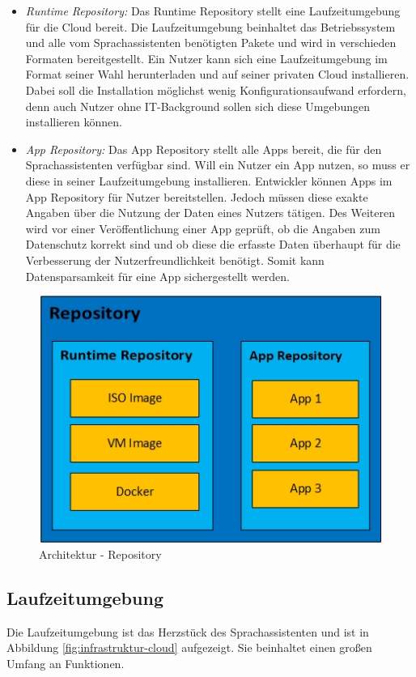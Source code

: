 \begin{itemize}
	\item \textsl{Runtime Repository:} Das Runtime Repository stellt eine Laufzeitumgebung für die Cloud bereit. Die Laufzeitumgebung beinhaltet das Betriebssystem und alle vom Sprachassistenten benötigten Pakete und wird in verschieden Formaten bereitgestellt. Ein Nutzer kann sich eine Laufzeitumgebung im Format seiner Wahl herunterladen und auf seiner privaten Cloud installieren. Dabei soll die Installation möglichst wenig Konfigurationsaufwand erfordern, denn auch Nutzer ohne IT-Background sollen sich diese Umgebungen installieren können. 
	\item \textsl{App Repository:} Das App Repository stellt alle Apps bereit, die für den Sprachassistenten verfügbar sind. Will ein Nutzer ein App nutzen, so muss er diese in seiner Laufzeitumgebung installieren. Entwickler können Apps im App Repository für Nutzer bereitstellen. Jedoch müssen diese exakte Angaben über die Nutzung der Daten eines Nutzers tätigen. Des Weiteren wird vor einer Veröffentlichung einer App geprüft, ob die Angaben zum Datenschutz korrekt sind und ob diese die erfasste Daten überhaupt für die Verbesserung der Nutzerfreundlichkeit benötigt. Somit kann Datensparsamkeit für eine App sichergestellt werden.
\end{itemize}


\begin{figure}[h!]
	\centering
	\includegraphics[width=0.6\linewidth]{Picture/Infrastruktur-Repository.jpg}
	\caption[Architektur - Mobile App]{Architektur - Repository}
	\label{fig:infrastruktur-repository}
\end{figure}

\subsection{Laufzeitumgebung}
Die Laufzeitumgebung ist das Herzstück des Sprachassistenten und ist in Abbildung \ref{fig:infrastruktur-cloud} aufgezeigt. Sie beinhaltet einen großen Umfang an Funktionen.

